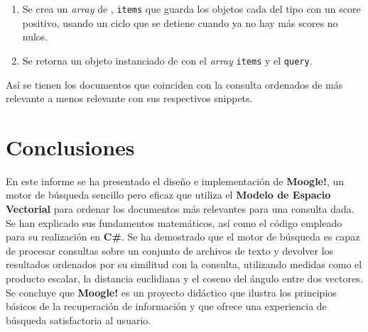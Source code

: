 \documentclass{article}
\begin{document}
\begin{itemize}
\begin{itemize}
\begin{enumerate}
\item Se crea un \textit{array} de , \texttt{items} que guarda los objetos cada del tipo  con un score positivo, usando un ciclo que se detiene cuando ya no hay más scores no nulos.
\item Se retorna un objeto instanciado de  con el \textit{array} \texttt{items} y el  \texttt{query}.
\end{enumerate}
Así se tienen los documentos que coinciden con la consulta ordenados de más relevante a menos relevante con sus respectivos snippets. 
\end{itemize} 
\end{itemize}
\section{Conclusiones} En este informe se ha presentado el diseño e implementación de \textbf{Moogle!}, un motor de búsqueda sencillo pero eficaz que utiliza el \textbf{Modelo de Espacio Vectorial} para ordenar los documentos más relevantes para una consulta dada. Se han explicado sus fundamentos matemáticos, así como el código empleado para su realización en \textbf{C\#}. Se ha demostrado que el motor de búsqueda es capaz de procesar consultas sobre un conjunto de archivos de texto y devolver los resultados ordenados por su similitud con la consulta, utilizando medidas como el producto escalar, la distancia euclidiana y el coseno del ángulo entre dos vectores. Se concluye que \textbf{Moogle!} es un proyecto didáctico que ilustra los principios básicos de la recuperación de información y que ofrece una experiencia de búsqueda satisfactoria al usuario.
\end{document}
